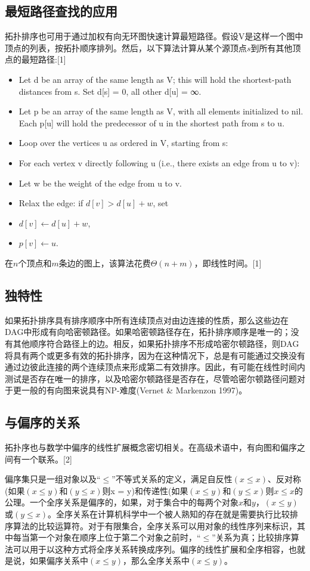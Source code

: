 \subsection{最短路径查找的应用}
拓扑排序也可用于通过加权有向无环图快速计算最短路径。假设V是这样一个图中顶点的列表，按拓扑顺序排列。然后，以下算法计算从某个源顶点$s$到所有其他顶点的最短路径:[1]
\begin{itemize}
\item Let d be an array of the same length as V; this will hold the shortest-path distances from s. Set d[s] = 0, all other d[u] = ∞.
\item Let p be an array of the same length as V, with all elements initialized to nil. Each p[u] will hold the predecessor of u in the shortest path from s to u.
\item Loop over the vertices u as ordered in V, starting from s:
\item For each vertex v directly following u (i.e., there exists an edge from u to v):
\item Let w be the weight of the edge from u to v.
\item Relax the edge: if $d[v] > d[u] + w$, set
\item $d[v] \longleftarrow d[u] + w$,
\item $p[v] \longleftarrow u$.
\end{itemize}
在$n$个顶点和$m$条边的图上，该算法花费$\Theta(n + m)$，即线性时间。[1]

\subsection{独特性}
如果拓扑排序具有排序顺序中所有连续顶点对由边连接的性质，那么这些边在DAG中形成有向哈密顿路径。如果哈密顿路径存在，拓扑排序顺序是唯一的；没有其他顺序符合路径上的边。相反，如果拓扑排序不形成哈密尔顿路径，则DAG将具有两个或更多有效的拓扑排序，因为在这种情况下，总是有可能通过交换没有通过边彼此连接的两个连续顶点来形成第二有效排序。因此，有可能在线性时间内测试是否存在唯一的排序，以及哈密尔顿路径是否存在，尽管哈密尔顿路径问题对于更一般的有向图来说具有NP-难度(Vernet & Markenzon 1997)。

\subsection{与偏序的关系}
拓扑序也与数学中偏序的线性扩展概念密切相关。在高级术语中，有向图和偏序之间有一个联系。[2]

偏序集只是一组对象以及“$\leq$”不等式关系的定义，满足自反性$(x\leq x)$、反对称(如果$(x\leq y)$和$(y\leq x)$则x = y)和传递性(如果$(x\leq y)$和$(y\leq x)$则$x\leq x$的公理。一个全序关系是偏序的，如果，对于集合中的每两个对象$x$和$y$，$(x\leq y)$或$(y\leq x)$。全序关系在计算机科学中一个被人熟知的存在就是需要执行比较排序算法的比较运算符。对于有限集合，全序关系可以用对象的线性序列来标识，其中每当第一个对象在顺序上位于第二个对象之前时，“$\leq$”关系为真；比较排序算法可以用于以这种方式将全序关系转换成序列。偏序的线性扩展和全序相容，也就是说，如果偏序关系中$(x\leq y)$，那么全序关系中$(x\leq y)$。

